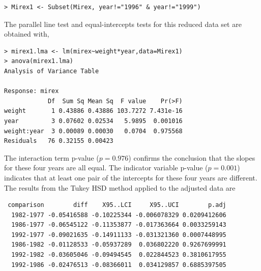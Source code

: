 \documentclass[10pt,openany]{book}\usepackage[]{graphicx}\usepackage[]{color}
\makeatletter
\newenvironment{kframe}{%
 \def\at@end@of@kframe{}%
 \ifinner\ifhmode%
  \def\at@end@of@kframe{\end{minipage}}%
  \begin{minipage}{\columnwidth}%
 \fi\fi%
 \def\FrameCommand##1{\hskip\@totalleftmargin \hskip-\fboxsep
 \colorbox{shadecolor}{##1}\hskip-\fboxsep
     \hskip-\linewidth \hskip-\@totalleftmargin \hskip\columnwidth}%
 \MakeFramed {\advance\hsize-\width
   \@totalleftmargin\z@ \linewidth\hsize
   \@setminipage}}%
 {\par\unskip\endMakeFramed%
 \at@end@of@kframe}
\newenvironment{knitrout}{}{} %
\makeatother
\begin{document}
\begin{knitrout}
\color{fgcolor}\begin{kframe}
\begin{verbatim}
> Mirex1 <- Subset(Mirex, year!="1996" & year!="1999")
\end{verbatim}
\end{kframe}
\end{knitrout}

The parallel line test and equal-intercepts tests for this reduced data set are obtained with,

\begin{knitrout}
\color{fgcolor}\begin{kframe}
\begin{verbatim}
> mirex1.lma <- lm(mirex~weight*year,data=Mirex1)
> anova(mirex1.lma)
Analysis of Variance Table

Response: mirex
            Df  Sum Sq Mean Sq  F value    Pr(>F)
weight       1 0.43886 0.43886 103.7272 7.431e-16
year         3 0.07602 0.02534   5.9895  0.001016
weight:year  3 0.00089 0.00030   0.0704  0.975568
Residuals   76 0.32155 0.00423                   
\end{verbatim}
\end{kframe}
\end{knitrout}

The interaction term p-value ($p=0.976$) confirms the conclusion that the slopes for these four years are all equal.  The indicator variable p-value ($p=0.001$) indicates that at least one pair of the intercepts for these four years are different.  The results from the Tukey HSD method applied to the adjusted data are

\begin{knitrout}
\color{fgcolor}\begin{kframe}
\begin{verbatim}
 comparison        diff    X95..LCI     X95..UCI        p.adj
  1982-1977 -0.05416588 -0.10225344 -0.006078329 0.0209412606
  1986-1977 -0.06545122 -0.11353877 -0.017363664 0.0033259143
  1992-1977 -0.09021635 -0.14911133 -0.031321360 0.0007448995
  1986-1982 -0.01128533 -0.05937289  0.036802220 0.9267699991
  1992-1982 -0.03605046 -0.09494545  0.022844523 0.3810617955
  1992-1986 -0.02476513 -0.08366011  0.034129857 0.6885397505
\end{verbatim}
\end{kframe}
\end{knitrout}
\end{document}
